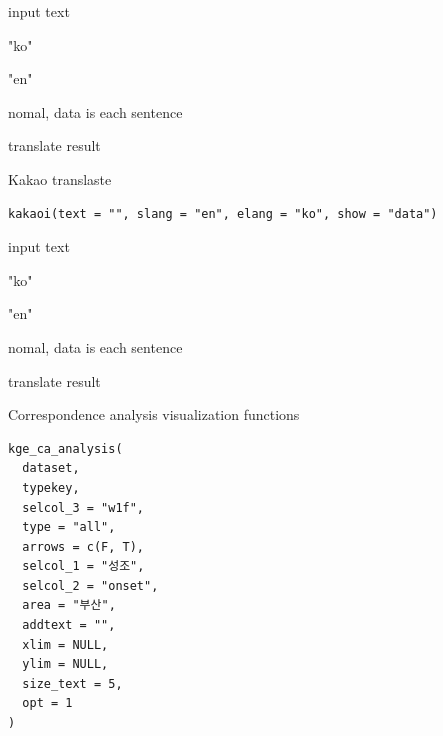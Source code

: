 \documentclass[a4paper]{book}
\begin{document}
%
\begin{Arguments}
\begin{ldescription}
\item[\code{text}] input text

\item[\code{slang}] "ko"

\item[\code{elang}] "en"

\item[\code{show}] nomal, data is each sentence
\end{ldescription}
\end{Arguments}
%
\begin{Value}
translate result
\end{Value}
%
\begin{Description}
Kakao translaste
\end{Description}
%
\begin{Usage}
\begin{verbatim}
kakaoi(text = "", slang = "en", elang = "ko", show = "data")
\end{verbatim}
\end{Usage}
%
\begin{Arguments}
\begin{ldescription}
\item[\code{text}] input text

\item[\code{slang}] "ko"

\item[\code{elang}] "en"

\item[\code{show}] nomal, data is each sentence
\end{ldescription}
\end{Arguments}
%
\begin{Value}
translate result
\end{Value}
%
\begin{Description}
Correspondence analysis visualization functions
\end{Description}
%
\begin{Usage}
\begin{verbatim}
kge_ca_analysis(
  dataset,
  typekey,
  selcol_3 = "w1f",
  type = "all",
  arrows = c(F, T),
  selcol_1 = "성조",
  selcol_2 = "onset",
  area = "부산",
  addtext = "",
  xlim = NULL,
  ylim = NULL,
  size_text = 5,
  opt = 1
)
\end{verbatim}
\end{Usage}
\end{document}
